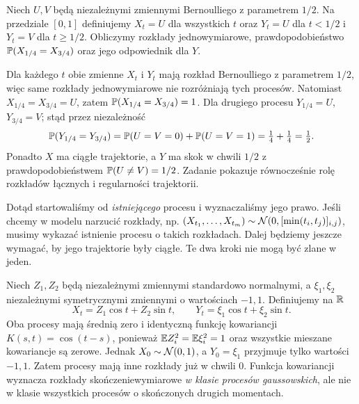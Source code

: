 \begin{zadanie}
Niech $U,V$ będą niezależnymi zmiennymi Bernoulliego z parametrem
$1/2$. Na przedziale $[0,1]$ definiujemy
$X_t=U$ dla wszystkich $t$ oraz
$Y_t=U$ dla $t<1/2$ i $Y_t=V$ dla $t\ge1/2$.
Obliczymy rozkłady jednowymiarowe, prawdopodobieństwo
$\mathbb{P}(X_{1/4}=X_{3/4})$ oraz jego odpowiednik dla $Y$.

Dla każdego $t$ obie zmienne $X_t$ i $Y_t$ mają rozkład
Bernoulliego z parametrem $1/2$, więc same rozkłady
jednowymiarowe nie rozróżniają tych procesów. Natomiast
$X_{1/4}=X_{3/4}=U$, zatem
$\mathbb{P}(X_{1/4}=X_{3/4})=1$.
Dla drugiego procesu
$Y_{1/4}=U$, $Y_{3/4}=V$; stąd przez niezależność
\[
\mathbb{P}(Y_{1/4}=Y_{3/4})
=\mathbb{P}(U=V=0)+\mathbb{P}(U=V=1)=\tfrac14+\tfrac14=\tfrac12.
\]
Ponadto $X$ ma ciągłe trajektorie, a $Y$ ma skok w chwili
$1/2$ z prawdopodobieństwem $\mathbb{P}(U\ne V)=1/2$.
Zadanie pokazuje równocześnie rolę rozkładów łącznych
i regularności trajektorii.
\end{zadanie}

\begin{uwaga}
Dotąd startowaliśmy od \emph{istniejącego} procesu i wyznaczaliśmy
jego prawo. Jeśli chcemy w modelu narzucić rozkłady, np.
$(X_{t_1},\ldots,X_{t_m})\sim\mathcal{N}(0,[\min(t_i,t_j)]_{i,j})$,
musimy wykazać istnienie procesu o takich rozkładach.
Dalej będziemy jeszcze wymagać, by jego trajektorie były ciągłe.
Te dwa kroki nie mogą być zlane w jeden.
\end{uwaga}


\begin{przyklad}
Niech $Z_1,Z_2$ będą niezależnymi zmiennymi standardowo
normalnymi, a $\xi_1,\xi_2$ niezależnymi symetrycznymi
zmiennymi o wartościach $-1,1$. Definiujemy na $\mathbb{R}$
\[
X_t=Z_1\cos t+Z_2\sin t,
\qquad Y_t=\xi_1\cos t+\xi_2\sin t.
\]
Oba procesy mają średnią zero i identyczną funkcję
kowariancji $K(s,t)=\cos(t-s)$, ponieważ
$\mathbb{E} Z_i^2=\mathbb{E}\xi_i^2=1$ oraz wszystkie mieszane
kowariancje są zerowe. Jednak $X_0\sim\mathcal{N}(0,1)$,
a $Y_0=\xi_1$ przyjmuje tylko wartości $-1,1$.
Zatem procesy mają inne rozkłady już w chwili $0$.
Funkcja kowariancji wyznacza rozkłady skończeniewymiarowe
\emph{w klasie procesów gaussowskich}, ale nie w klasie
wszystkich procesów o skończonych drugich momentach.
\end{przyklad}

